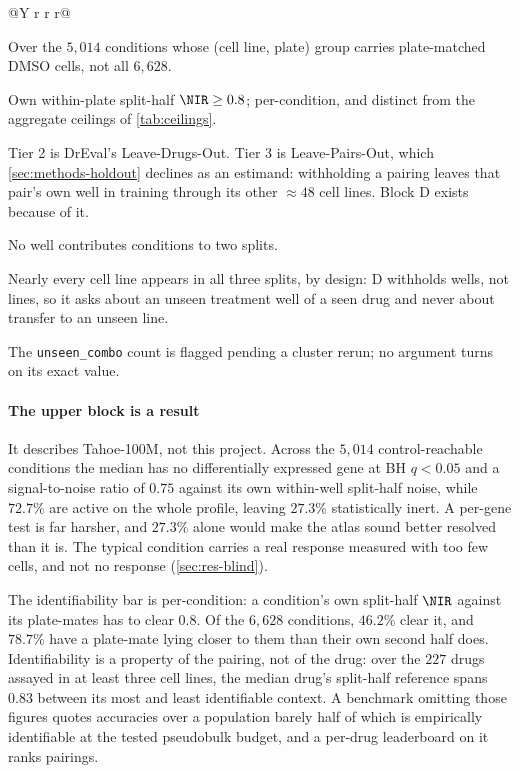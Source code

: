 \begin{table}[htbp]
\begin{fullwidth}
\begin{minipage}{\linewidth}
\begin{threeparttable}
\begin{tabularx}{\linewidth}{@{}Y r r r@{}}
\end{tabularx}
\begin{tablenotes}[flushleft]
\item[a] Over the $5{,}014$ conditions whose (cell line, plate) group carries
plate-matched DMSO cells, not all $6{,}628$.
\item[b] Own within-plate split-half $\NIR \geq 0.8$; per-condition, and distinct
from the aggregate ceilings of \cref{tab:ceilings}.
\item[c] Tier 2 is DrEval's Leave-Drugs-Out. Tier 3 is Leave-Pairs-Out, which
\cref{sec:methods-holdout} declines as an estimand: withholding a pairing leaves
that pair's own well in training through its other $\approx 48$ cell lines.
Block D exists because of it.
\item[d] No well contributes conditions to two splits.
\item[e] Nearly every cell line appears in all three splits, by design: D
withholds wells, not lines, so it asks about an unseen treatment well of a seen
drug and never about transfer to an unseen line.
\item The \texttt{unseen\_combo} count is flagged pending a cluster rerun; no
argument turns on its exact value.
\end{tablenotes}
\end{threeparttable}
\end{minipage}
\end{fullwidth}
\end{table}

\paragraph{The upper block is a result} It describes Tahoe-100M, not this
project. Across the $5{,}014$ control-reachable conditions the median has no
differentially expressed gene at BH $q<0.05$ and a signal-to-noise ratio of
$0.75$ against its own within-well split-half noise, while $72.7\%$ are active
on the whole profile, leaving $27.3\%$ statistically inert. A per-gene test is
far harsher, and $27.3\%$ alone would make the atlas sound better resolved than
it is. The typical condition carries a real response
measured with too few cells, and not no response (\cref{sec:res-blind}).

The identifiability bar is per-condition: a condition's own split-half $\NIR$
against its plate-mates has to clear $0.8$. Of the $6{,}628$ conditions,
$46.2\%$ clear it, and $78.7\%$ have a plate-mate lying closer to them than
their own second half does. Identifiability is a property of the pairing, not of
the drug: over the $227$ drugs assayed in at least three cell lines, the median
drug's split-half reference spans $0.83$ between its most and least identifiable
context. A benchmark omitting those figures
quotes accuracies over a population barely half of which is empirically
identifiable at the tested pseudobulk budget, and a per-drug leaderboard on it
ranks pairings.

